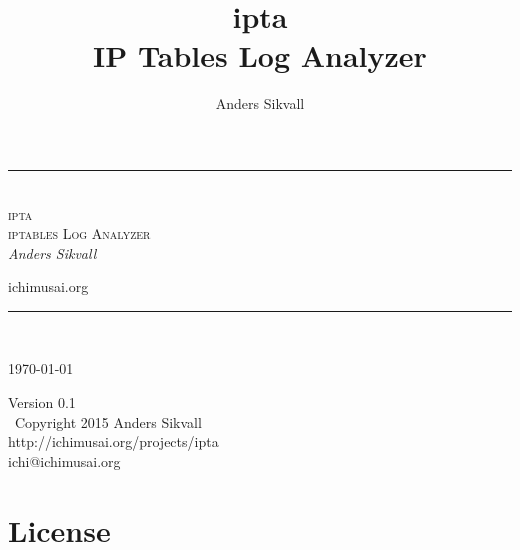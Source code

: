 \documentclass[english,twoside,openright,a4paper,12pt]{article}
\author{Anders Sikvall}
\title{
  \Huge ipta\\[2em]
  IP Tables Log Analyzer}
\newcommand{\titlerule}{\rule{\linewidth}{1pt}}
\begin{document}
\begin{titlepage}
  \thispagestyle{empty}
  \begin{center}
  \end{center}
  \begin{center}
    \titlerule\\[3mm]
    \Huge \textsc{ipta\\\Large iptables Log Analyzer}\\[5mm]
    \large \emph{Anders Sikvall}\\
    \begin{center}
      \normalsize ichimusai.org\\
      
    \end{center}
    \titlerule\\
  \end{center}
  \scriptsize \today
\end{titlepage}

\null\vfill\thispagestyle{empty}
\noindent

\begin{center}
	Version 0.1\\[5mm] \textcopyright\ Copyright 2015 Anders Sikvall\\
	http://ichimusai.org/projects/ipta\\
	ichi@ichimusai.org
	\newpage
\end{center}

\cleardoublepage

\tableofcontents

\setlength{\parindent}{0pt}
\setlength{\parskip}{1em}

\lhead{\nouppercase{\leftmark}}
\rhead{\nouppercase{\rightmark}}

\setlength{\headheight}{15pt}

\pagestyle{fancy}


\newpage
\section*{License}
\label{license}
\end{document}
